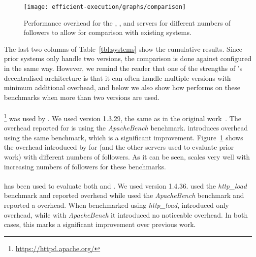 \begin{figure}[!t]
 \centering
 \texttt{[image: efficient-execution/graphs/comparison]}
 \caption{Performance overhead for the \httpd, \thttpd, and \lighttpd
   servers for different numbers of followers to allow for comparison
   with existing systems.}
 \label{fig:comparison}
\end{figure}


The last two columns of Table~\ref{tbl:systems} show the cumulative
results.  Since prior systems only handle two versions, the comparison
is done against \varan configured in the same way.  However, we remind
the reader that one of the strengths of \varan's decentralised
architecture is that it can often handle multiple versions with minimum
additional overhead, and below we also show how \varan performs on
these benchmarks when more than two versions are used.

\paragraph{\httpd} \footnote{\url{https://httpd.apache.org/}}
was used by \orchestra.  We used version 1.3.29, the same as in the
original work~\cite{orchestra09}.  The overhead reported for
\orchestra is \orchestraHttpd using the \emph{ApacheBench}
benchmark. \varan introduces \httpdAbOneFollower overhead using the
same benchmark, which is a significant improvement.
Figure~\ref{fig:comparison} shows the overhead introduced by \varan
for \httpd (and the other servers used to evaluate prior work) with
different numbers of followers.  As it can be seen, \varan scales very
well with increasing numbers of followers for these benchmarks.


\paragraph{\lighttpd} %
has been used to evaluate both \mx and \tachyon.  We used version
1.4.36. %
\mx used the \emph{http\_load} benchmark and reported \mxLighttpd overhead
while \tachyon used the \emph{ApacheBench} benchmark and reported a
\tachyonLighttpd overhead.  When benchmarked using \emph{http\_load},
\varan introduced only \lighttpdHttploadOneFollower overhead, while with
\emph{ApacheBench} it introduced no noticeable
overhead. %
In both
cases, this marks a significant improvement over previous work.

